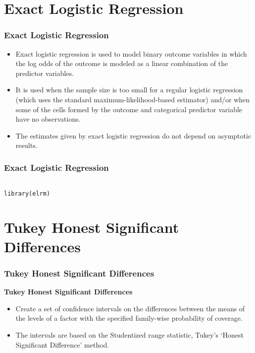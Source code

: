 \section*{Exact Logistic Regression }
\begin{frame}[fragile]
\frametitle{Exact Logistic Regression}

\begin{itemize}

\item Exact logistic regression is used to model 
binary outcome variables in which the log odds of 
the outcome is modeled as a linear combination of 
the predictor variables. 
\item It is used when the sample size is too small for a regular logistic regression (which uses the standard maximum-likelihood-based estimator) and/or when some of the cells formed by the outcome and categorical predictor variable have no observations. 
\item The estimates given by exact logistic regression do not depend on asymptotic results.

\end{itemize}

\end{frame}


\begin{frame}[fragile]
\frametitle{Exact Logistic Regression}

\begin{framed}
\begin{verbatim}

library(elrm)

\end{verbatim}
\end{framed}

\end{frame}

\section*{Tukey Honest Significant Differences}

\begin{frame}[fragile]
\frametitle{Tukey Honest Significant Differences}

\textbf{Tukey Honest Significant Differences}

\begin{itemize}

\item Create a set of confidence intervals on 
the differences between the means of the levels 
of a factor with the specified family-wise probability of coverage. 
\item The intervals are based on the Studentized range statistic, Tukey's ‘Honest Significant Difference’ method.

\end{itemize}

\end{frame}

